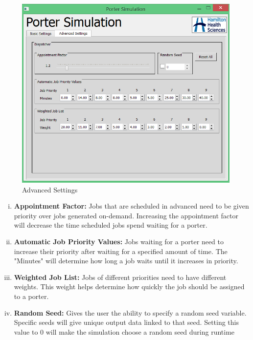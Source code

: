 \documentclass[paper=letter, fontsize=10pt]{scrartcl}
\numberwithin{equation}{section}		%
\numberwithin{figure}{section}			%
\numberwithin{table}{section}				%
\begin{document}
	\begin{figure}[!htbp]
	\begin{center}
		\includegraphics[width=1\columnwidth, height=0.45\textheight, keepaspectratio]{AdvancedSettings.png}
		\caption{Advanced Settings}
	\end{center}
	\end{figure} 
	\begin{enumerate}[(i)]
		\item \textbf{Appointment Factor:} Jobs that are scheduled in advanced need to be given priority over jobs generated on-demand.  Increasing the appointment factor will decrease the time scheduled jobs spend waiting for a porter.
		\item \textbf{Automatic Job Priority Values:} Jobs waiting for a porter need to increase their priority after waiting for a specified amount of time.  The "Minutes" will determine how long a job waits until it increases in priority.
		\item \textbf{Weighted Job List:} Jobs of different priorities need to have different weights.  This weight helps determine how quickly the job should be assigned to a porter.
		\item \textbf{Random Seed:} Gives the user the ability to specify a random seed variable. Specific seeds will give unique output data linked to that seed. Setting this value to 0 will make the simulation choose a random seed during runtime
	\end{enumerate}
	
\end{document}
